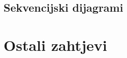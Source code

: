 			\subsection{Sekvencijski dijagrami}
				
				
    
				\eject
	
		\section{Ostali zahtjevi}
		
		 
			 
			 
			 
	